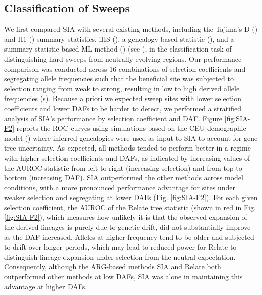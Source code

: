 \subsection{Classification of Sweeps}
We first compared \ac{SIA} with several existing methods, including the Tajima’s D (\cite{tajima_statistical_1989}) and H1 (\cite{garud_recent_2015}) summary statistics, iHS (\cite{voight_map_2006}), a genealogy-based statistic (\cite{speidel_method_2019}), and a summary-statistic-based \ac{ML} method (\cite{schrider_shic_2016,kern_diploshic_2018}) (see ), in the classification task of distinguishing hard sweeps from neutrally evolving regions. Our performance comparison was conducted across 16 combinations of selection coefficients and segregating allele frequencies such that the beneficial site was subjected to selection ranging from weak to strong, resulting in low to high derived allele frequencies (s). Because a priori we expected sweep sites with lower selection coefficients and lower \acp{DAF} to be harder to detect, we performed a stratified analysis of \ac{SIA}’s performance by selection coefficient and \ac{DAF}. Figure \ref{fig:SIA-F2} reports the \acf{ROC} curves using simulations based on the CEU demographic model (\cite{tennessen_evolution_2012}) where inferred genealogies were used as input to \ac{SIA} to account for gene tree uncertainty. As expected, all methods tended to perform better in a regime with higher selection coefficients and \acp{DAF}, as indicated by increasing values of the \ac{AUROC} statistic from left to right (increasing selection) and from top to bottom (increasing \ac{DAF}). \ac{SIA} outperformed the other methods across model conditions, with a more pronounced performance advantage for sites under weaker selection and segregating at lower \acp{DAF} (Fig. \ref{fig:SIA-F2}). For each given selection coefficient, the \ac{AUROC} of the Relate tree statistic (shown in red in Fig. \ref{fig:SIA-F2}), which measures how unlikely it is that the observed expansion of the derived lineages is purely due to genetic drift, did not substantially improve as the \ac{DAF} increased. Alleles at higher frequency tend to be older and subjected to drift over longer periods, which may lead to reduced power for Relate to distinguish lineage expansion under selection from the neutral expectation. Consequently, although the \ac{ARG}-based methods \ac{SIA} and Relate both outperformed other methods at low \acp{DAF}, \ac{SIA} was alone in maintaining this advantage at higher \acp{DAF}.

